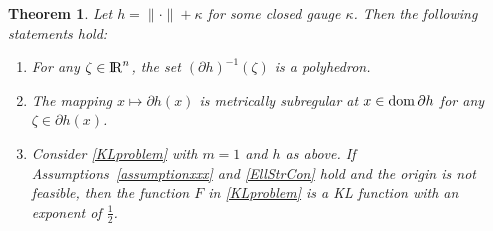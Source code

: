 \documentclass[10pt]{article}
\numberwithin{equation}{section}
\newtheorem{theorem}{Theorem}[section]
\def\R{{\rm I\!R}}
\def\dom{{\rm dom}\,}
\begin{document}
\begin{theorem}\label{KLnorm}
Let $h = \|\cdot\| + \kappa$ for some closed gauge $\kappa$. Then the following statements hold:
\begin{enumerate}[{\rm (i)}]
   \item For any $\zeta\in \R^n$, the set $(\partial h)^{-1}(\zeta)$ is a polyhedron.
   \item The mapping $x\mapsto \partial h(x)$ is metrically subregular at $x\in\dom \partial h$ for any $\zeta\in \partial h(x)$.
   \item Consider \eqref{KLproblem} with $m = 1$ and $h$ as above. If Assumptions~\ref{assumptionxxx} and \ref{EllStrCon} hold and the origin is not feasible, then the function $F$ in \eqref{KLproblem} is a KL function with an exponent of $\frac{1}{2}$.
 \end{enumerate}
\end{theorem}
\end{document}

